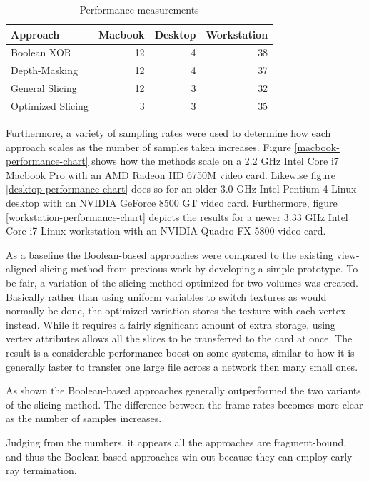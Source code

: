 \documentclass{report}
\begin{document}
\begin{table}
  \centering
  \begin{tabular}{ l r r r }
    \toprule
    Approach & Macbook & Desktop & Workstation\\
    \midrule
    Boolean XOR & 12 & 4 & 38 \\
    Depth-Masking & 12 & 4 & 37 \\
    General Slicing & 12 & 3 & 32 \\
    Optimized Slicing & 3 & 3 & 35 \\
    \bottomrule
  \end{tabular}
  \caption{Performance measurements}
  \label{performance-table}
\end{table}

Furthermore, a variety of sampling rates were used to determine how each
approach scales as the number of samples taken increases.  Figure
\ref{macbook-performance-chart} shows how the methods scale on a 2.2 GHz Intel
Core i7 Macbook Pro with an AMD Radeon HD 6750M video card.  Likewise figure
\ref{desktop-performance-chart} does so for an older 3.0 GHz Intel Pentium 4
Linux desktop with an NVIDIA GeForce 8500 GT video card.  Furthermore, figure
\ref{workstation-performance-chart} depicts the results for a newer 3.33 GHz
Intel Core i7 Linux workstation with an NVIDIA Quadro FX 5800 video card.

As a baseline the Boolean-based approaches were compared to the existing
view-aligned slicing method from previous work by developing a simple prototype.
To be fair, a variation of the slicing method optimized for two volumes was
created.  Basically rather than using uniform variables to switch textures as
would normally be done, the optimized variation stores the texture with each
vertex instead.  While it requires a fairly significant amount of extra storage,
using vertex attributes allows all the slices to be transferred to the card at
once.  The result is a considerable performance boost on some systems, similar
to how it is generally faster to transfer one large file across a network then
many small ones.

As shown the Boolean-based approaches generally outperformed the two variants of
the slicing method.  The difference between the frame rates becomes more clear
as the number of samples increases.

Judging from the numbers, it appears all the approaches are fragment-bound, and
thus the Boolean-based approaches win out because they can employ early ray
termination.
\end{document}
